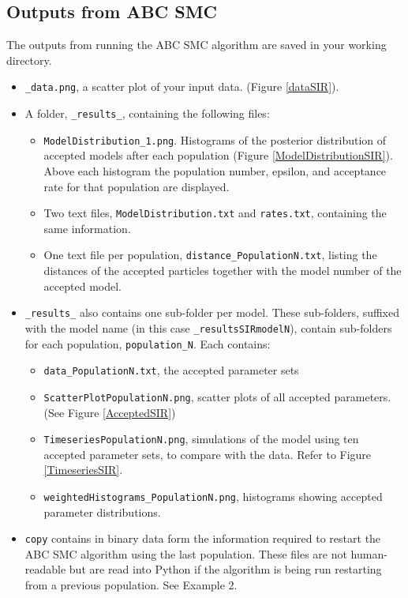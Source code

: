 \documentclass[a4paper]{report}
\begin{document}
\subsection*{Outputs from ABC SMC}
The outputs from running the ABC SMC algorithm are saved in your working directory.
\begin{itemize}
\item \verb$_data.png$, a scatter plot of your input data. (Figure \ref{dataSIR}).
\item A folder, \verb$_results_$, containing the following files:
\begin{itemize}
\item \verb$ModelDistribution_1.png$. Histograms of the posterior distribution of accepted models after each population (Figure \ref{ModelDistributionSIR}). Above each histogram the population number, epsilon, and acceptance rate for that population are displayed.
\item Two text files, \verb$ModelDistribution.txt$ and \verb$rates.txt$, containing the same information.
\item One text file per population, \verb$distance_PopulationN.txt$, listing the distances of the accepted particles together with the model number of the accepted model.
\end{itemize}
\item \verb$_results_$ also contains one sub-folder per model. These sub-folders, suffixed with the model name (in this case \verb$_resultsSIRmodelN$), contain sub-folders for each population, \verb$population_N$. Each contains:
\begin{itemize}
\item \verb$data_PopulationN.txt$, the accepted parameter sets
\item \verb$ScatterPlotPopulationN.png$, scatter plots of all accepted parameters. (See Figure \ref{AcceptedSIR})
\item \verb$TimeseriesPopulationN.png$, simulations of the model using ten accepted parameter sets, to compare with the data. Refer to Figure \ref{TimeseriesSIR}.
\item \verb$weightedHistograms_PopulationN.png$, histograms showing accepted parameter distributions.
\end{itemize}
\item \verb$copy$ contains in binary data form the information required to restart the ABC SMC algorithm using the last population. These files are not human-readable but are read into Python if the algorithm is being run restarting from a previous population. See Example 2.
\end{itemize}
\end{document}
